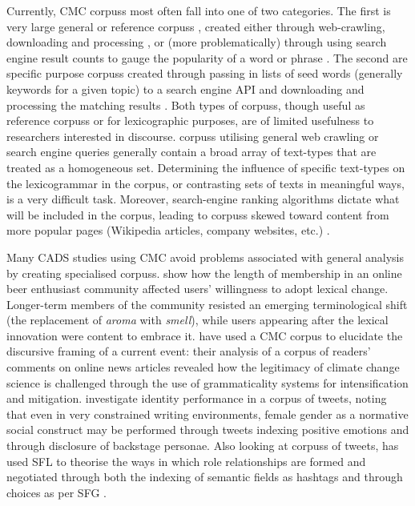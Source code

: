 Currently, \gls{CMC} \glspl{corpus} most often fall into one of two categories. The first is very large general or reference \glspl{corpus} \cite[e.g.][]{minocha_feed_2013,fletcher_corpus_2012,baroni_wacky_2009,kilgarriff_estenten_2013}, created either through web\hyp{}crawling, downloading and processing \cite[see][]{baroni_wacky_2009}, or (more problematically) through using search engine result counts to gauge the popularity of a word or phrase \cite[see][]{kilgarriff_googleology_2007}. The second are specific purpose \glspl{corpus} created through passing in lists of seed words (generally keywords for a given topic) to a search engine \gls{API} and downloading and processing the matching results \cite[see][]{baroni_webbootcat:_2006}. Both types of \glspl{corpus}, though useful as reference \glspl{corpus} or for lexicographic purposes, are of limited usefulness to researchers interested in discourse. \Glspl{corpus} utilising general web crawling or search engine queries generally contain a broad array of text\hyp{}types that are treated as a homogeneous set. Determining the influence of specific text\hyp{}types on the lexicogrammar in the \gls{corpus}, or contrasting sets of texts in meaningful ways, is a very difficult task. Moreover, search\hyp{}engine ranking algorithms dictate what will be included in the corpus, leading to \glspl{corpus} skewed toward content from more popular pages (Wikipedia articles, company websites, etc.) \cite{kilgarriff_webbootcat_2013}.

Many \gls{CADS} studies using \gls{CMC} avoid problems associated with general analysis by creating specialised \glspl{corpus}. \textcite{danescu-niculescu-mizil_no_2013} show how the length of membership in an online beer enthusiast community affected users' willingness to adopt lexical change. Longer-term members of the community resisted an emerging terminological shift (the replacement of \emph{aroma} with \emph{smell}), while users appearing after the lexical innovation were content to embrace it. \textcite{koteyko_climate_2013} have used a \gls{CMC} \gls{corpus} to elucidate the discursive framing of a current event: their analysis of a \gls{corpus} of readers' comments on online news articles revealed how the legitimacy of climate change science is challenged through the use of grammaticality systems for intensification and mitigation. \textcite{courtney_walton_mediated_2013} investigate identity performance in a \gls{corpus} of tweets, noting that even in very constrained writing environments, female gender as a normative social construct may be performed through tweets indexing positive emotions and through disclosure of backstage personae. Also looking at \glspl{corpus} of tweets, \textcite{zappavigna_ambient_2011,zappavigna_discourse_2012,zappavigna_enacting_2013} has used \gls{SFL} to theorise the ways in which role relationships are formed and negotiated through both the indexing of semantic fields as hashtags and through  choices as per \gls{SFG} \cite[see][]{halliday_introduction_2004}.

